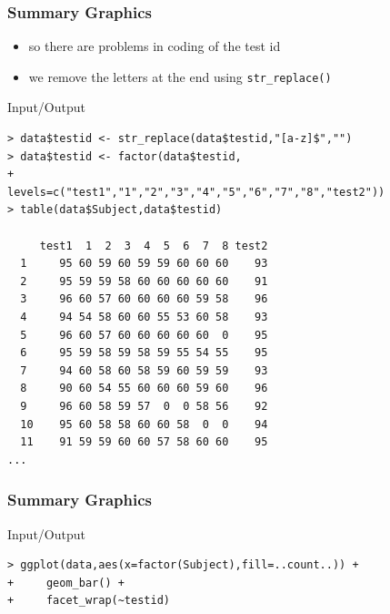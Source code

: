 \documentclass[xcolor={table},c]{beamer}
\begin{document}
\begin{frame}[fragile]\frametitle{Summary Graphics}
  \begin{itemize}
  \item so there are problems in coding of the test id
  \item we remove the letters at the end using \texttt{str\_replace()}
  \end{itemize}
\begin{exampleblock}{Input/Output}\tiny
\begin{verbatim}
> data$testid <- str_replace(data$testid,"[a-z]$","")
> data$testid <- factor(data$testid,
+                       levels=c("test1","1","2","3","4","5","6","7","8","test2"))
> table(data$Subject,data$testid)
    
     test1  1  2  3  4  5  6  7  8 test2
  1     95 60 59 60 59 59 60 60 60    93
  2     95 59 59 58 60 60 60 60 60    91
  3     96 60 57 60 60 60 60 59 58    96
  4     94 54 58 60 60 55 53 60 58    93
  5     96 60 57 60 60 60 60 60  0    95
  6     95 59 58 59 58 59 55 54 55    95
  7     94 60 58 60 58 59 60 59 59    93
  8     90 60 54 55 60 60 60 59 60    96
  9     96 60 58 59 57  0  0 58 56    92
  10    95 60 58 58 60 60 58  0  0    94
  11    91 59 59 60 60 57 58 60 60    95
...

\end{verbatim}
    \end{exampleblock}
\end{frame}


\begin{frame}[fragile]\frametitle{Summary Graphics}
\begin{exampleblock}{Input/Output}\tiny
\begin{verbatim}
> ggplot(data,aes(x=factor(Subject),fill=..count..)) +
+     geom_bar() +
+     facet_wrap(~testid)
\end{verbatim}
    \end{exampleblock}
\begin{center}
\end{center}
\end{frame}
\end{document}
